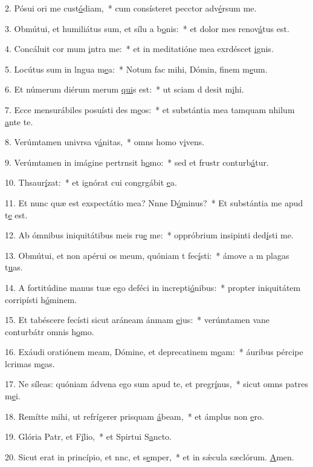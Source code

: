 2. Pósui ori me cust\uline{ó}diam,~* cum consísteret pecctor adv\uline{é}rsum me.\par 
3. Obmútui, et humiliátus sum, et sílu a b\uline{o}nis:~* et dolor mes renov\uline{á}tus est.\par 
4. Concáluit cor mum \uline{i}ntra me:~* et in meditatióne mea exrdéscet \uline{i}gnis.\par 
5. Locútus sum in lngua m\uline{e}a:~* Notum fac mihi, Dómin, finem m\uline{e}um.\par 
6. Et númerum diérum merum \uline{qui}s est:~* ut sciam d desit m\uline{i}hi.\par 
7. Ecce mensurábiles posuísti des m\uline{e}os:~* et substántia mea tamquam nhilum \uline{a}nte te.\par 
8. Verúmtamen univrsa v\uline{á}nitas,~* omns homo v\uline{i}vens.\par 
9. Verúmtamen in imágine pertrnsit h\uline{o}mo:~* sed et frustr conturb\uline{á}tur.\par 
10. Thsaur\uline{í}zat:~* et ignórat cui congrgábit \uline{e}a.\par 
11. Et nunc quæ est exspectátio mea? Nnne D\uline{ó}minus?~* Et substántia me apud t\uline{e} est.\par 
12. Ab ómnibus iniquitátibus meis ru\uline{e} me:~* oppróbrium insipinti ded\uline{í}sti me.\par 
13. Obmútui, et non apérui os meum, quóniam t fec\uline{í}sti:~* ámove a m plagas t\uline{u}as.\par 
14. A fortitúdine manus tuæ ego deféci in increpti\uline{ó}nibus:~* propter iniquitátem corripísti h\uline{ó}minem.\par 
15. Et tabéscere fecísti sicut aráneam ánmam \uline{e}jus:~* verúmtamen vane conturbátr omnis h\uline{o}mo.\par 
16. Exáudi oratiónem meam, Dómine, et deprecatinem m\uline{e}am:~* áuribus pércipe lcrimas m\uline{e}as.\par 
17. Ne síleas: quóniam ádvena ego sum apud te, et pregr\uline{í}nus,~* sicut omns patres m\uline{e}i.\par 
18. Remítte mihi, ut refrígerer prisquam \uline{á}beam,~* et ámplus non \uline{e}ro.\par 
19. Glória Patr, et F\uline{í}lio,~* et Spirtui S\uline{a}ncto.\par 
20. Sicut erat in princípio, et nnc, et s\uline{e}mper,~* et in sǽcula sæclórum. \uline{A}men.\par 
